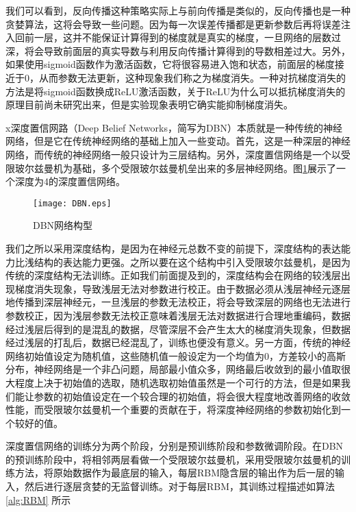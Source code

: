 我们可以看到，反向传播这种策略实际上与前向传播是类似的，反向传播也是一种贪婪算法，这将会导致一些问题。因为每一次误差传播都是更新参数后再将误差注入回前一层，这并不能保证计算得到的梯度就是真实的梯度，一旦网络的层数过深，将会导致前面层的真实导数与利用反向传播计算得到的导数相差过大。另外，如果使用sigmoid函数作为激活函数，它将很容易进入饱和状态，前面层的梯度接近于0，从而参数无法更新，这种现象我们称之为梯度消失。一种对抗梯度消失的方法是将sigmoid函数换成ReLU激活函数，关于ReLU为什么可以抵抗梯度消失的原理目前尚未研究出来，但是实验现象表明它确实能抑制梯度消失。

x深度置信网路（Deep Belief Networks，简写为DBN）本质就是一种传统的神经网络，但是它在传统神经网络的基础上加入一些变动。首先，这是一种深层的神经网络，而传统的神经网络一般只设计为三层结构。另外，深度置信网络是一个以受限玻尔兹曼机为基础，多个受限玻尔兹曼机垒出来的多层神经网络。图\ref{img:DBN}展示了一个深度为4的深度置信网络。
\begin{figure}[!htbp]
\centering
\texttt{[image: DBN.eps]}
\caption{DBN网络构型}
\label{img:DBN}
\end{figure}

我们之所以采用深度结构，是因为在神经元总数不变的前提下，深度结构的表达能力比浅结构的表达能力更强。之所以要在这个结构中引入受限玻尔兹曼机，是因为传统的深度结构无法训练。正如我们前面提及到的，深度结构会在网络的较浅层出现梯度消失现象，导致浅层无法对参数进行校正。由于数据必须从浅层神经元逐层地传播到深层神经元，一旦浅层的参数无法校正，将会导致深层的网络也无法进行参数校正，因为浅层参数无法校正意味着浅层无法对数据进行合理地重编码，数据经过浅层后得到的是混乱的数据，尽管深层不会产生太大的梯度消失现象，但数据经过浅层的打乱后，数据已经混乱了，训练也便没有意义。另一方面，传统的神经网络初始值设定为随机值，这些随机值一般设定为一个均值为0，方差较小的高斯分布，神经网络是一个非凸问题，局部最小值众多，网络最后收敛到的最小值取很大程度上决于初始值的选取，随机选取初始值虽然是一个可行的方法，但是如果我们能让参数的初始值设定在一个较合理的初始值，将会很大程度地改善网络的收敛性能，而受限玻尔兹曼机一个重要的贡献在于，将深度神经网络的参数初始化到一个较好的值。

深度置信网络的训练分为两个阶段，分别是预训练阶段和参数微调阶段。在DBN的预训练阶段中，将相邻两层看做一个受限玻尔兹曼机，采用受限玻尔兹曼机的训练方法，将原始数据作为最底层的输入，每层RBM隐含层的输出作为后一层的输入，然后进行逐层贪婪的无监督训练。对于每层RBM，其训练过程描述如算法\ref{alg:RBM} 所示

